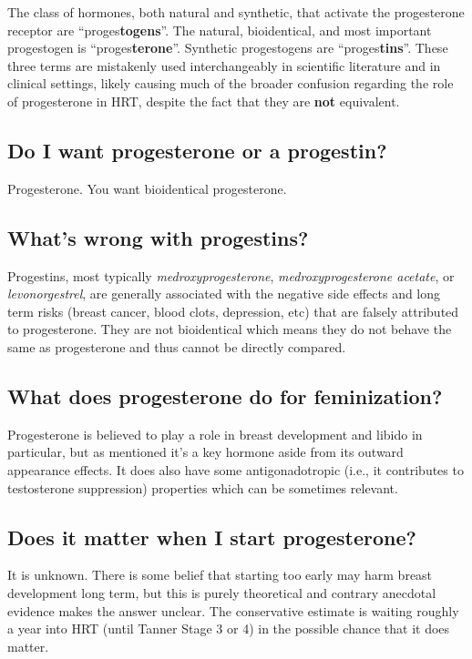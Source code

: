 \documentclass{article}
\begin{document}
The class of hormones, both natural and synthetic, that activate the progesterone receptor are “proges\textbf{togens}”. The natural, bioidentical, and most important progestogen is “proges\textbf{terone}”. Synthetic progestogens are “proges\textbf{tins}”. These three terms are mistakenly used interchangeably in scientific literature and in clinical settings, likely causing much of the broader confusion regarding the role of progesterone in HRT, despite the fact that they are \textbf{not} equivalent.

\subsection{Do I want progesterone or a progestin?}

Progesterone. You want bioidentical progesterone.

\subsection{What’s wrong with progestins?}

Progestins, most typically \textit{medroxyprogesterone}, \textit{medroxyprogesterone acetate}, or \textit{levonorgestrel}, are generally associated with the negative side effects and long term risks (breast cancer, blood clots, depression, etc) that are falsely attributed to progesterone. They are not bioidentical which means they do not behave the same as progesterone and thus cannot be directly compared.

\subsection{What does progesterone do for feminization?}

Progesterone is believed to play a role in breast development and libido in particular, but as mentioned it’s a key hormone aside from its outward appearance effects. It does also have some antigonadotropic (i.e., it contributes to testosterone suppression) properties which can be sometimes relevant.

\subsection{Does it matter when I start progesterone?}

It is unknown. There is some belief that starting too early may harm breast development long term, but this is purely theoretical and contrary anecdotal evidence makes the answer unclear. The conservative estimate is waiting roughly a year into HRT (until Tanner Stage 3 or 4) in the possible chance that it does matter.
\end{document}
